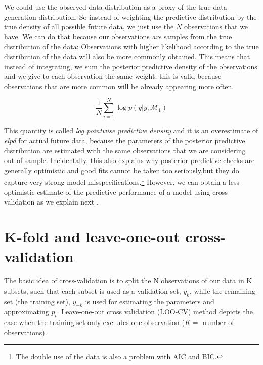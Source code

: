 \documentclass[12pt,]{krantz}
\theoremstyle{definition}
\theoremstyle{definition}
\theoremstyle{definition}
\theoremstyle{remark}
\begin{document}
We could use the observed data distribution as a proxy of the true data generation distribution. So instead of weighting the predictive distribution by the true density of all possible future data, we just use the \(N\) observations that we have. We can do that because our observations \emph{are} samples from the true distribution of the data: Observations with higher likelihood according to the true distribution of the data will also be more commonly obtained. This means that instead of integrating, we sum the posterior predictive density of the observations and we give to each observation the same weight; this is valid because observations that are more common will be already appearing more often.

\begin{equation}
\frac{1}{N} \sum_{i=1}^{N} \log p(y|y, \mathcal{M}_1) 
\end{equation}

This quantity is called \emph{log pointwise predictive density} \citep[without the \(1/N\) in][]{vehtariPracticalBayesianModel2017} and it is an overestimate of \emph{elpd} for actual future data, because the parameters of the posterior predictive distribution are estimated with the same observations that we are considering out-of-sample. Incidentally, this also explains why posterior predictive checks are generally optimistic and good fits cannot be taken too seriously,but they do capture very strong model misspecifications.\footnote{The double use of the data is also a problem with AIC and BIC.} However, we can obtain a less optimistic estimate of the predictive performance of a model using cross validation \citep{GeisserEddy1979} as we explain next \citep[there are, however, also other alternatives to cross validation presented in][]{VehtariOjanen2012}.

\hypertarget{k-fold-and-leave-one-out-cross-validation}{%
\section{K-fold and leave-one-out cross-validation}\label{k-fold-and-leave-one-out-cross-validation}}

The basic idea of cross-validation is to split the N observations of our data in K subsets, such that each subset is used as a validation set, \(y_k\), while the remaining set (the training set), \(y_{-k}\) is used for estimating the parameters and approximating \(p_t\). Leave-one-out cross validation (LOO-CV) method depicts the case when the training set only excludes one observation (\(K =\) number of observations).
\end{document}

